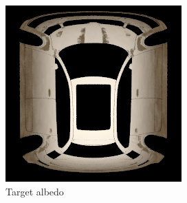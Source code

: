 \begin{figure}
    \centering
    \caption{We present our results side-by-side with the ground truth albedo as generated by
    a procedural dirt texture generator $\mathcal{G}_0$. The dataset this model was trained on
    contains images of cars rendered only from one side with a constant elevation angle. This
    causes the model to not learn patches that weren't visible in the whole dataset.}
    \label{fig:results-albedo}
    \vspace{0.2in}
    \begin{subfigure}[t]{0.4\linewidth}
        \centering
        \includegraphics[width=\linewidth]{graphics/results_0_albedo.png}
        \caption{Target albedo}
    \end{subfigure}
    \begin{subfigure}[t]{0.4\linewidth}
        \centering

\end{subfigure}
\end{figure}
